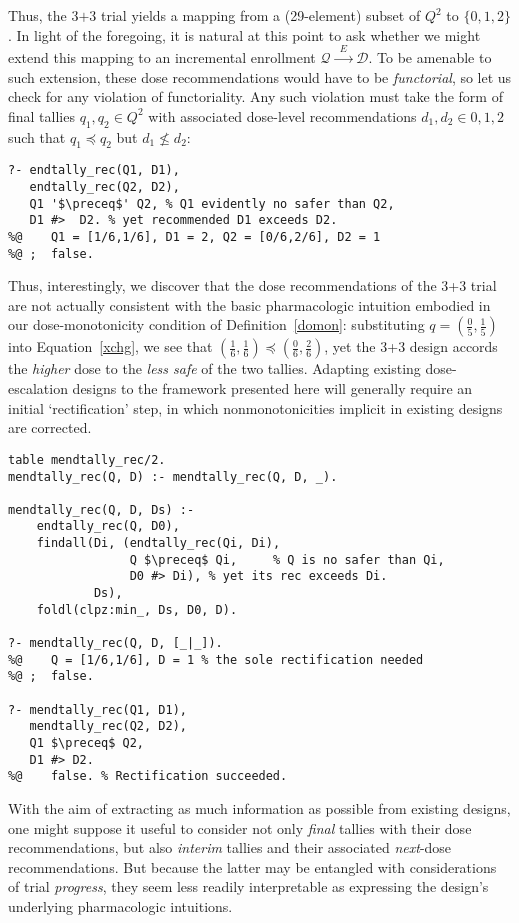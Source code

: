 \documentclass{article}
\newcommand{\D}{\ensuremath{\mathcal{D}}}
\newcommand{\Q}{\ensuremath{\mathcal{Q}}}
\begin{document}
Thus, the $\mbox{3+3}$ trial yields a mapping from a (29-element) subset of $Q^2$ to $\{0,1,2\}$.  In light of the foregoing, it is natural at this point to ask whether we might extend this mapping to an incremental enrollment $\Q \xrightarrow{\;\;E\;\;} \D$.  To be amenable to such extension, these dose recommendations would have to be {\em functorial}, so let us check for any violation of functoriality.  Any such violation must take the form of final tallies $q_1, q_2 \in Q^2$ with associated dose-level recommendations $d_1, d_2 \in {0,1,2}$ such that $q_1 \preceq q_2$ but $d_1 \not\leq d_2$:

\begin{lstlisting}
?- endtally_rec(Q1, D1),
   endtally_rec(Q2, D2),
   Q1 '$\preceq$' Q2, % Q1 evidently no safer than Q2,
   D1 #>  D2. % yet recommended D1 exceeds D2.
%@    Q1 = [1/6,1/6], D1 = 2, Q2 = [0/6,2/6], D2 = 1
%@ ;  false.
\end{lstlisting}

Thus, interestingly, we discover that the dose recommendations of the \mbox{3+3} trial are not actually consistent with the basic pharmacologic intuition embodied in our dose-monotonicity condition of Definition~\ref{domon}: substituting $q = (\frac{0}{5},\frac{1}{5})$ into Equation~\eqref{xchg}, we see that $(\frac{1}{6},\frac{1}{6}) \preceq (\frac{0}{6},\frac{2}{6})$, yet the \mbox{3+3} design accords the {\em higher} dose to the {\em less safe} of the two tallies.  Adapting existing dose-escalation designs to the framework presented here will generally require an initial `rectification' step, in which nonmonotonicities implicit in existing designs are corrected.

\begin{lstlisting}
table mendtally_rec/2.
mendtally_rec(Q, D) :- mendtally_rec(Q, D, _).

mendtally_rec(Q, D, Ds) :-
    endtally_rec(Q, D0),
    findall(Di, (endtally_rec(Qi, Di),
                 Q $\preceq$ Qi,     % Q is no safer than Qi,
                 D0 #> Di), % yet its rec exceeds Di.
            Ds),
    foldl(clpz:min_, Ds, D0, D).

?- mendtally_rec(Q, D, [_|_]).
%@    Q = [1/6,1/6], D = 1 % the sole rectification needed
%@ ;  false.

?- mendtally_rec(Q1, D1),
   mendtally_rec(Q2, D2),
   Q1 $\preceq$ Q2,
   D1 #> D2.
%@    false. % Rectification succeeded.
\end{lstlisting}

With the aim of extracting as much information as possible from existing designs, one might suppose it useful to consider not only {\em final} tallies with their dose recommendations, but also {\em interim} tallies and their associated {\em next}-dose recommendations.  But because the latter may be entangled with considerations of trial {\em progress}, they seem less readily interpretable as expressing the design's underlying pharmacologic intuitions.
\end{document}
